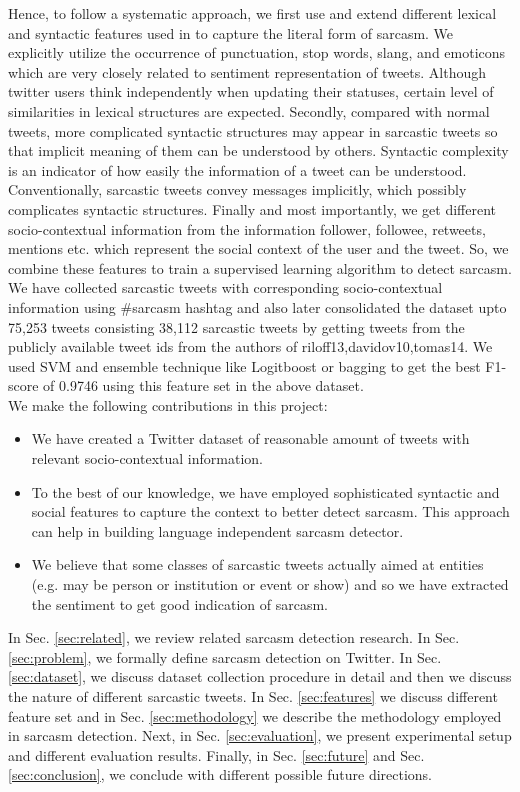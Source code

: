Hence, to follow a systematic approach, we first use and extend different lexical and syntactic features used in \cite{riloff13,davidov10,tomas14,gonzalez_acl} to capture the literal form of sarcasm. We explicitly utilize the occurrence of punctuation, stop words, slang, and emoticons which are very closely related to sentiment representation of tweets. Although twitter users think independently when updating their statuses, certain level of similarities in lexical structures are expected. Secondly, compared with normal tweets, more complicated syntactic structures may appear in sarcastic tweets so that implicit meaning of them can be understood by others. Syntactic complexity is an indicator of how easily the information of a tweet can be understood. Conventionally, sarcastic tweets convey messages implicitly, which possibly complicates syntactic structures. Finally and most importantly, we get different socio-contextual information from the information follower, followee, retweets, mentions etc. which represent the social context of the user and the tweet. So, we combine these features to train a supervised learning algorithm to detect sarcasm. We have collected sarcastic tweets with corresponding socio-contextual information using \#sarcasm hashtag and also later consolidated the dataset upto 75,253 tweets consisting 38,112 sarcastic tweets by getting tweets from the publicly available tweet ids from the authors of {riloff13,davidov10,tomas14}. We used SVM and ensemble technique like Logitboost or bagging to get the best F1-score of 0.9746 using this feature set in the above dataset.\\ 

\noindent We make the following contributions in this project:
\begin{itemize}
 \item We have created a Twitter dataset of reasonable amount of tweets with relevant socio-contextual information.
 \item To the best of our knowledge, we have employed sophisticated syntactic and social features to capture the context to better detect sarcasm. This approach can help in building language independent sarcasm detector.
 \item We believe that some classes of sarcastic tweets actually aimed at entities (e.g. may be person or institution or event or show) and so we have extracted the sentiment to get good indication of sarcasm.\\
\end{itemize}

In Sec. \ref{sec:related}, we review related sarcasm detection research. In Sec. \ref{sec:problem}, we formally define sarcasm detection on Twitter. In Sec. \ref{sec:dataset}, we discuss dataset collection procedure in detail and then we discuss the nature of different sarcastic tweets. In Sec. \ref{sec:features} we discuss different feature set and in Sec. \ref{sec:methodology} we describe the methodology employed in sarcasm detection. Next, in Sec. \ref{sec:evaluation}, we present experimental setup and different evaluation results. Finally, in Sec. \ref{sec:future} and Sec. \ref{sec:conclusion}, we conclude with different possible future directions.



